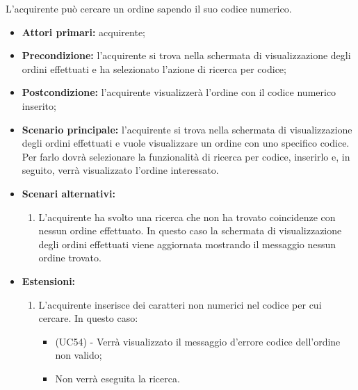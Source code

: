 
L'acquirente può cercare un ordine sapendo il suo codice numerico.
\begin{itemize}
    \item \textbf{Attori primari:} acquirente;
    \item \textbf{Precondizione:} l'acquirente si trova nella schermata di visualizzazione degli ordini effettuati e ha selezionato l'azione di ricerca per codice;
    \item \textbf{Postcondizione:} l'acquirente visualizzerà l'ordine con il codice numerico inserito;
    \item \textbf{Scenario principale:} l'acquirente si trova nella schermata di visualizzazione degli ordini effettuati e vuole visualizzare un ordine con uno specifico codice. Per farlo dovrà selezionare la funzionalità di ricerca per codice, inserirlo e, in seguito, verrà visualizzato l'ordine interessato.
    \item \textbf{Scenari alternativi:}
    \begin{enumerate}[label=\lett]
    	\item L'acquirente ha svolto una ricerca che non ha trovato coincidenze con nessun ordine effettuato. In questo caso la schermata di visualizzazione degli ordini effettuati viene aggiornata mostrando il messaggio nessun ordine trovato.
    \end{enumerate}
    \item \textbf{Estensioni:}
    \begin{enumerate}[label=\lett]
        \item L'acquirente inserisce dei caratteri non numerici nel codice per cui cercare. In questo caso:
        \begin{itemize}
            \item (UC54) - Verrà visualizzato il messaggio d'errore codice dell'ordine non valido;
            \item Non verrà eseguita la ricerca.
        \end{itemize}
    \end{enumerate}
\end{itemize}


